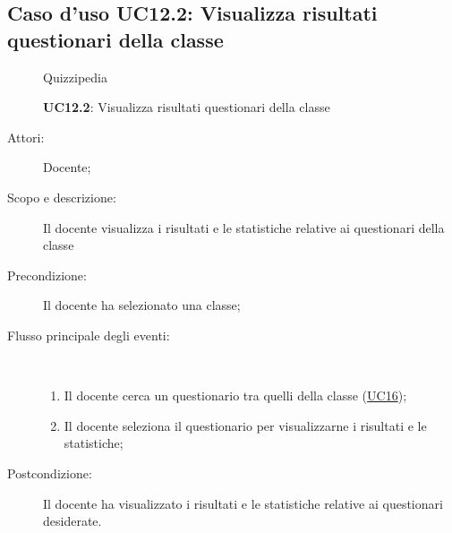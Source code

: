 \subsection{Caso d'uso UC12.2: Visualizza risultati questionari della classe}
	\begin{figure}[H]
		\centering
		\begin{resizedtikzpicture}{\textwidth}
		\begin{umlsystem}[x=0, fill=lightgray!20]{Quizzipedia}
		\end{umlsystem}
		\end{resizedtikzpicture}
		\caption{\textbf{UC12.2}: Visualizza risultati questionari della classe}
		\label{UC12.2}
	\end{figure}
\begin{description}
\item[Attori:] Docente;
\item[Scopo e descrizione:] Il docente visualizza i risultati e le statistiche relative ai questionari della classe
      \item[Precondizione:] Il docente ha selezionato una classe;

        \item[Flusso principale degli eventi:] \ 
 \begin{enumerate}
          \item Il docente cerca un questionario tra quelli della classe (\hyperlink{UC16}{UC16});
          \item Il docente seleziona il questionario per visualizzarne i risultati e le statistiche;

      \end{enumerate}
    \item[Postcondizione:] Il docente ha visualizzato i risultati e le statistiche relative ai questionari desiderate.
  \end{description}
\hypertarget{UC12.3}{}
